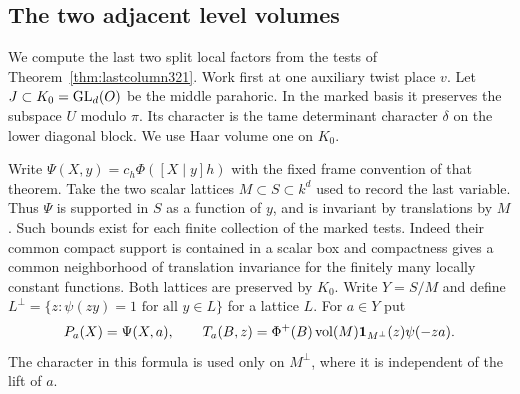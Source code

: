 \documentclass[a4paper,11pt]{article}
\theoremstyle{definition}
\theoremstyle{remark}
\numberwithin{equation}{section}
\begin{document}
\subsection{The two adjacent level volumes}\label{nav:VIII-65}
We compute the last two split local factors from the tests of
Theorem~\ref{thm:lastcolumn321}. Work first at one auxiliary
twist place \(v\). Let \(J\subset K_0={\rm GL}_d(O)\) be the
middle parahoric. In the marked basis it preserves the subspace
\(U\) modulo \(\pi\). Its character is the tame determinant
character \(\delta\) on the lower diagonal block. We use Haar
volume one on \(K_0\).

Write \(\Psi(X,y)=c_h\Phi([X\mid y]h)\) with the fixed
frame convention of that theorem. Take the two scalar
lattices \(M\subset S\subset k^d\) used to record the last
variable. Thus \(\Psi\) is supported in \(S\) as a function
of \(y\), and is invariant by translations by \(M\).
Such bounds exist for each finite collection of the marked
tests. Indeed their common compact support is contained in
a scalar box and compactness gives a common neighborhood
of translation invariance for the finitely many locally
constant functions. Both lattices are preserved by \(K_0\).
Write \(Y=S/M\) and define \(L^\perp=\{z:\psi(zy)=1
\text{ for all }y\in L\}\) for a lattice \(L\). For
\(a\in Y\) put
\[
 P_a(X)=\Psi(X,a),\qquad
 T_a(B,z)=\Phi^+(B)\,{\rm vol}(M)
                \mathbf1_{M^\perp}(z)\psi(-za).
\]
The character in this formula is used only on \(M^\perp\),
where it is independent of the lift of \(a\).
\end{document}
